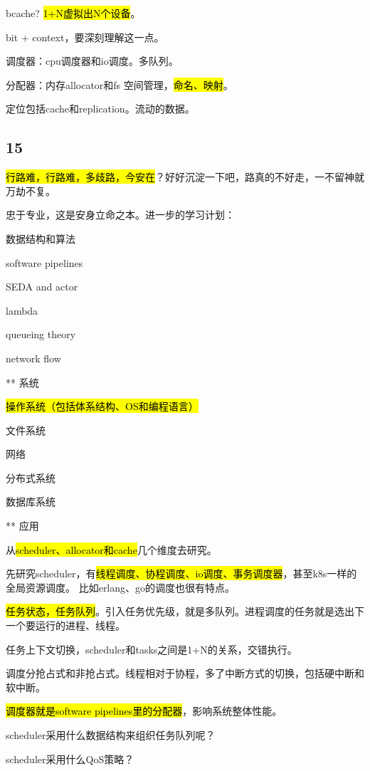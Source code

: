 bcache? \hl{1+N虚拟出N个设备}。

bit + context，要深刻理解这一点。

\hrulefill

调度器：cpu调度器和io调度。多队列。

分配器：内存allocator和fs 空间管理，\hl{命名、映射}。

定位包括cache和replication。流动的数据。

\subsection{15}

\hl{行路难，行路难，多歧路，今安在}？好好沉淀一下吧，路真的不好走，一不留神就万劫不复。

忠于专业，这是安身立命之本。进一步的学习计划：
\begin{enumbox}
\item 数据结构和算法
\item software pipelines
\item SEDA and actor
\item lambda
\item queueing theory
\item network flow
\item *** 系统
\item \hl{操作系统（包括体系结构、OS和编程语言）}
\item 文件系统
\item 网络
\item 分布式系统
\item 数据库系统
\item *** 应用
\end{enumbox}

从\hl{scheduler、allocator和cache}几个维度去研究。

先研究scheduler，有\hl{线程调度、协程调度、io调度、事务调度器}，甚至k8s一样的全局资源调度。
比如erlang、go的调度也很有特点。

\hl{任务状态，任务队列}。引入任务优先级，就是多队列。进程调度的任务就是选出下一个要运行的进程、线程。

任务上下文切换，scheduler和tasks之间是1+N的关系，交错执行。

调度分抢占式和非抢占式。线程相对于协程，多了中断方式的切换，包括硬中断和软中断。

\hl{调度器就是software pipelines里的分配器}，影响系统整体性能。

scheduler采用什么数据结构来组织任务队列呢？

scheduler采用什么QoS策略？

